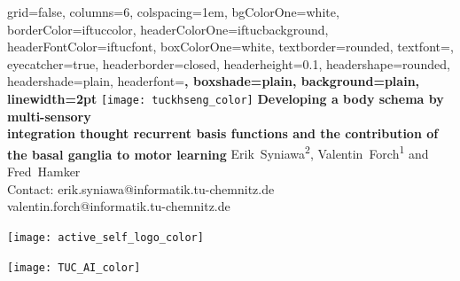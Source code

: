 \documentclass[portrait,final,a0paper,fontscale=0.33]{baposter}
\begin{document}
\begin{poster}%
	{
		grid=false,
		columns=6,
		colspacing=1em,
		bgColorOne=white,
		borderColor=iftuccolor,
		headerColorOne=iftucbackground,
		headerFontColor=iftucfont,
		boxColorOne=white,
		textborder=rounded,
		textfont=\small,
		eyecatcher=true,
		headerborder=closed,
		headerheight=0.1\textheight,
		headershape=rounded,
		headershade=plain,
		headerfont=\Large\bf, %
		boxshade=plain,
		background=plain,
		linewidth=2pt
	}
	{\texttt{[image: tuckhseng\_color]}} 
	{\bf\Large{Developing a body schema by multi-sensory\\ integration thought recurrent basis functions and the contribution of the basal ganglia to motor learning}\vspace{5pt}}
	{\large Erik~Syniawa\textsuperscript{2}, Valentin~Forch\textsuperscript{1} and Fred~Hamker \\ \vspace{0.5em}
	\small Contact: erik.syniawa@informatik.tu-chemnitz.de \\
	\hspace{43pt} valentin.forch@informatik.tu-chemnitz.de
	}
	{	
		\begin{minipage}[r]{0.1\textwidth}
			\texttt{[image: active\_self\_logo\_color]}
		\end{minipage}
		\hfill
		\begin{minipage}[r]{0.1\textwidth}
			\texttt{[image: TUC\_AI\_color]}
		\end{minipage}
		
	}

\end{poster}
\end{document}
